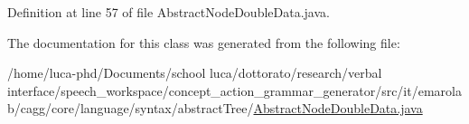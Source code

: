 Definition at line 57 of file Abstract\-Node\-Double\-Data.\-java.



The documentation for this class was generated from the following file\-:\begin{DoxyCompactItemize}
\item 
/home/luca-\/phd/\-Documents/school luca/dottorato/research/verbal interface/speech\-\_\-workspace/concept\-\_\-action\-\_\-grammar\-\_\-generator/src/it/emarolab/cagg/core/language/syntax/abstract\-Tree/\hyperlink{AbstractNodeDoubleData_8java}{Abstract\-Node\-Double\-Data.\-java}\end{DoxyCompactItemize}
